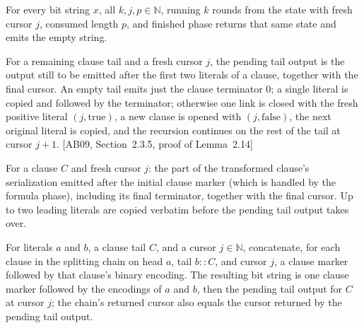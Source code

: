 \begin{lemma}
\label{Complexity.satStreamRun_finished}
\leanok
{}
For every bit string $x$, all $k,j,p\in\mathbb{N}$, running $k$ rounds from the state
with fresh cursor $j$, consumed length $p$, and finished phase returns that same state
and emits the empty string.
\end{lemma}

\begin{definition}
\label{Complexity.satStreamTail}
\leanok
{}
For a remaining clause tail and a fresh cursor $j$, the pending tail output is the
output still to be emitted after the first two literals of a clause, together with
the final cursor. An empty tail emits just the clause terminator $0$; a single
literal is copied and followed by the terminator; otherwise one link is closed
with the fresh positive literal $(j,\mathrm{true})$, a new clause is opened with
$(j,\mathrm{false})$, the next original literal is copied, and the recursion
continues on the rest of the tail at cursor $j + 1$.
[AB09, Section~2.3.5, proof of Lemma~2.14]
\end{definition}

\begin{definition}
\label{Complexity.satStreamClause}
\leanok
{}
For a clause $C$ and fresh cursor $j$: the part of the transformed clause's
serialization emitted after the initial clause marker (which is handled by the
formula phase), including its final terminator, together with the final cursor.
Up to two leading literals are copied verbatim before the pending tail output
takes over.
\end{definition}

\begin{lemma}
\label{Complexity.satStreamTail_chain}
\leanok
{}
For literals $a$ and $b$, a clause tail $C$, and a cursor $j\in\mathbb{N}$, concatenate,
for each clause in the splitting chain on head $a$, tail $b::C$, and cursor $j$, a
clause marker followed by that clause's binary encoding. The resulting bit string is one
clause marker followed by the encodings of $a$ and $b$, then the pending tail output for
$C$ at cursor $j$; the chain's returned cursor also equals the cursor returned by the
pending tail output.
\end{lemma}

